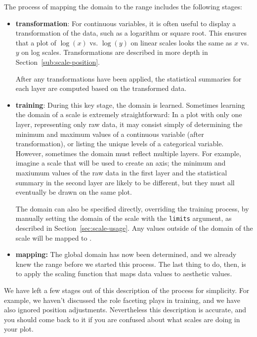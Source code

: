 The process of mapping the domain to the range includes the following stages:

\begin{itemize}

  \item {\bf transformation}: For continuous variables, it is often useful to display a transformation of the data, such as a logarithm or square root.  This ensures that a plot of $\log(x)$ vs. $\log(y)$ on linear scales looks the same as $x$ vs. $y$ on log scales.  Transformations are described in more depth in Section~\ref{sub:scale-position}.

  After any transformations have been applied, the statistical summaries for each layer are computed based on the transformed data.

  \item {\bf training}:  During this key stage, the domain is learned.  Sometimes learning the domain of a scale is extremely straightforward: In a plot with only one layer, representing only raw data, it may consist simply of determining the minimum and maximum values of a continuous variable (after transformation), or listing the unique levels of a categorical variable.  However, sometimes the domain must reflect multiple layers.  For example, imagine a scale that will be used to create an axis; the minimum and maxiumum values of the raw data in the first layer and the statistical summary in the second layer are likely to be different, but they must all eventually be drawn on the same plot.

  The domain can also be specified directly, overriding the training process, by manually setting the domain of the scale with the {\tt limits} argument, as described in Section~\ref{sec:scale-usage}.  Any values outside of the domain of the scale will be mapped to .

  \item {\bf mapping:}  The global domain has now been determined, and we already knew the range before we started this process.  The last thing to do, then, is to apply the scaling function that maps data values to aesthetic values. 

\end{itemize}

We have left a few stages out of this description of the process for simplicity.  For example, we haven't discussed the role faceting plays in training, and we have also ignored position adjustments.  Nevertheless this description is accurate, and you should come back to it if you are confused about what scales are doing in your plot.

